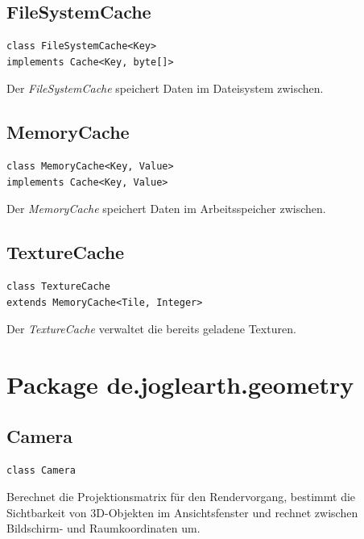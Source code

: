 \documentclass[10pt]{scrreprt}
\begin{document}
\vspace{5mm}
\subsection*{FileSystemCache}
\begin{lstlisting}
class FileSystemCache<Key>
implements Cache<Key, byte[]>
\end{lstlisting}
Der \textit{FileSystemCache} speichert Daten im Dateisystem zwischen.\\

\vspace{5mm}
\subsection*{MemoryCache}
\begin{lstlisting}
class MemoryCache<Key, Value>
implements Cache<Key, Value>
\end{lstlisting}
Der \textit{MemoryCache} speichert Daten im Arbeitsspeicher zwischen.\\

\vspace{5mm}
\subsection*{TextureCache}
\begin{lstlisting}
class TextureCache
extends MemoryCache<Tile, Integer>
\end{lstlisting}
Der \textit{TextureCache} verwaltet die bereits geladene Texturen.\\



\vspace{5mm}
\section{Package de.joglearth.geometry}
\subsection*{Camera}
\begin{lstlisting}
class Camera
\end{lstlisting}
Berechnet die Projektionsmatrix für den Rendervorgang, bestimmt die Sichtbarkeit von 3D-Objekten im Ansichtsfenster und rechnet zwischen Bildschirm- und Raumkoordinaten um.\\

\vspace{5mm}
\end{document}
